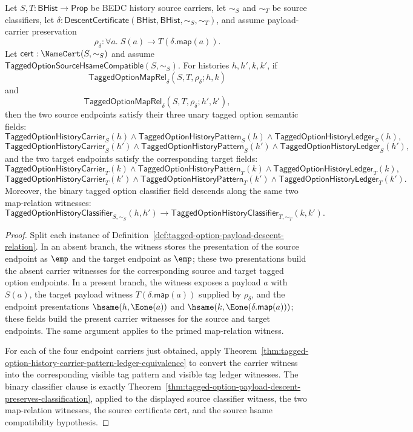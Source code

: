 \begin{theorem}
\label{thm:tagged-option-payload-descent-semantic-fields}
Let $S,T:\mathsf{BHist}\to\mathsf{Prop}$ be BEDC history source carriers, let
$\sim_S$ and $\sim_T$ be source classifiers, let
$\delta:\mathsf{DescentCertificate}(\mathsf{BHist},\mathsf{BHist},\sim_S,\sim_T)$,
and assume payload-carrier preservation
$$
\rho_{\delta}:\forall a.\;S(a)\to T(\delta.\mathsf{map}(a)).
$$
Let $\mathsf{cert}:\NameCert(S,\sim_S)$ and assume
$\mathsf{TaggedOptionSourceHsameCompatible}(S,\sim_S)$. For histories
$h,h',k,k'$, if
$$
\mathsf{TaggedOptionMapRel}_{\delta}(S,T,\rho_{\delta};h,k)
$$
and
$$
\mathsf{TaggedOptionMapRel}_{\delta}(S,T,\rho_{\delta};h',k'),
$$
then the two source endpoints satisfy their three unary tagged option semantic
fields:
$$
\mathsf{TaggedOptionHistoryCarrier}_S(h)\land
\mathsf{TaggedOptionHistoryPattern}_S(h)\land
\mathsf{TaggedOptionHistoryLedger}_S(h),
$$
$$
\mathsf{TaggedOptionHistoryCarrier}_S(h')\land
\mathsf{TaggedOptionHistoryPattern}_S(h')\land
\mathsf{TaggedOptionHistoryLedger}_S(h'),
$$
and the two target endpoints satisfy the corresponding target fields:
$$
\mathsf{TaggedOptionHistoryCarrier}_T(k)\land
\mathsf{TaggedOptionHistoryPattern}_T(k)\land
\mathsf{TaggedOptionHistoryLedger}_T(k),
$$
$$
\mathsf{TaggedOptionHistoryCarrier}_T(k')\land
\mathsf{TaggedOptionHistoryPattern}_T(k')\land
\mathsf{TaggedOptionHistoryLedger}_T(k').
$$
Moreover, the binary tagged option classifier field descends along the same
two map-relation witnesses:
$$
\mathsf{TaggedOptionHistoryClassifier}_{S,\sim_S}(h,h')\to
\mathsf{TaggedOptionHistoryClassifier}_{T,\sim_T}(k,k').
$$
\end{theorem}
\begin{proof}
Split each instance of
Definition~\ref{def:tagged-option-payload-descent-relation}. In an absent
branch, the witness stores the presentation of the source endpoint as $\emp$
and the target endpoint as $\emp$; these two presentations build the absent
carrier witnesses for the corresponding source and target tagged option
endpoints. In a present branch, the witness exposes a payload $a$ with
$S(a)$, the target payload witness
$T(\delta.\mathsf{map}(a))$ supplied by $\rho_{\delta}$, and the endpoint
presentations $\hsame(h,\Eone(a))$ and
$\hsame(k,\Eone(\delta.\mathsf{map}(a)))$; these fields build the present
carrier witnesses for the source and target endpoints. The same argument
applies to the primed map-relation witness.

For each of the four endpoint carriers just obtained, apply
Theorem~\ref{thm:tagged-option-history-carrier-pattern-ledger-equivalence} to
convert the carrier witness into the corresponding visible tag pattern and
visible tag ledger witnesses. The binary classifier clause is exactly
Theorem~\ref{thm:tagged-option-payload-descent-preserves-classification},
applied to the displayed source classifier witness, the two map-relation
witnesses, the source certificate $\mathsf{cert}$, and the source hsame
compatibility hypothesis.
\end{proof}

